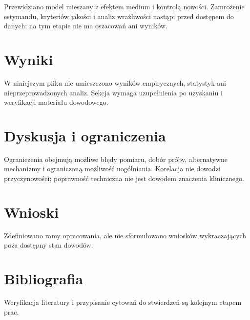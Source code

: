 \documentclass[11pt,a4paper]{article}
\begin{document}
Przewidziano model mieszany z efektem medium i kontrolą nowości. Zamrożenie estymandu, kryteriów jakości i analiz wrażliwości nastąpi przed dostępem do danych; na tym etapie nie ma oszacowań ani wyników.

\section{Wyniki}

W niniejszym pliku nie umieszczono wyników empirycznych, statystyk ani nieprzeprowadzonych analiz. Sekcja wymaga uzupełnienia po uzyskaniu i weryfikacji materiału dowodowego.

\section{Dyskusja i ograniczenia}

Ograniczenia obejmują możliwe błędy pomiaru, dobór próby, alternatywne mechanizmy i ograniczoną możliwość uogólniania. Korelacja nie dowodzi przyczynowości; poprawność techniczna nie jest dowodem znaczenia klinicznego.

\section{Wnioski}

Zdefiniowano ramy opracowania, ale nie sformułowano wniosków wykraczających poza dostępny stan dowodów.

\section*{Bibliografia}

Weryfikacja literatury i przypisanie cytowań do stwierdzeń są kolejnym etapem prac.
\end{document}
